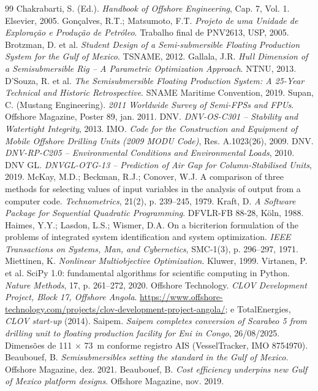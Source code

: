 \documentclass[11pt,a4paper]{article}
\begin{document}
\begin{thebibliography}{99}
 Chakrabarti, S. (Ed.). \emph{Handbook of Offshore Engineering}, Cap. 7,
Vol. 1. Elsevier, 2005.
 Gonçalves, R.T.; Matsumoto, F.T. \emph{Projeto de uma Unidade de Exploração
e Produção de Petróleo}. Trabalho final de PNV2613, USP, 2005.
 Brotzman, D. et al. \emph{Student Design of a Semi-submersible Floating
Production System for the Gulf of Mexico}. TSNAME, 2012.
 Gallala, J.R. \emph{Hull Dimension of a Semisubmersible Rig -- A Parametric
Optimization Approach}. NTNU, 2013.
 D'Souza, R. et al. \emph{The Semisubmersible Floating Production System: A
25-Year Technical and Historic Retrospective}. SNAME Maritime Convention, 2019.
 Supan, C. (Mustang Engineering). \emph{2011 Worldwide Survey of Semi-FPSs and
FPUs}. Offshore Magazine, Poster 89, jan. 2011.
 DNV. \emph{DNV-OS-C301 -- Stability and Watertight Integrity}, 2013.
 IMO. \emph{Code for the Construction and Equipment of Mobile Offshore Drilling
Units (2009 MODU Code)}, Res. A.1023(26), 2009.
 DNV. \emph{DNV-RP-C205 -- Environmental Conditions and Environmental Loads}, 2010.
 DNV GL. \emph{DNVGL-OTG-13 -- Prediction of Air Gap for Column-Stabilised
Units}, 2019.
 McKay, M.D.; Beckman, R.J.; Conover, W.J. A comparison of three methods for
selecting values of input variables in the analysis of output from a computer code.
\emph{Technometrics}, 21(2), p. 239--245, 1979.
 Kraft, D. \emph{A Software Package for Sequential Quadratic Programming}.
DFVLR-FB 88-28, Köln, 1988.
 Haimes, Y.Y.; Lasdon, L.S.; Wismer, D.A. On a bicriterion formulation of the
problems of integrated system identification and system optimization. \emph{IEEE Transactions on
Systems, Man, and Cybernetics}, SMC-1(3), p. 296--297, 1971.
 Miettinen, K. \emph{Nonlinear Multiobjective Optimization}. Kluwer, 1999.
 Virtanen, P. et al. SciPy 1.0: fundamental algorithms for scientific computing in
Python. \emph{Nature Methods}, 17, p. 261--272, 2020.
 Offshore Technology. \emph{CLOV Development Project, Block 17, Offshore Angola}.
\url{https://www.offshore-technology.com/projects/clov-development-project-angola/}; e TotalEnergies,
\emph{CLOV start-up} (2014).
 Saipem. \emph{Saipem completes conversion of Scarabeo 5 from drilling unit to
floating production facility for Eni in Congo}, 26/08/2025. Dimensões de 111 × 73~m conforme
registro AIS (VesselTracker, IMO 8754970).
 Beaubouef, B. \emph{Semisubmersibles setting the standard in the Gulf of
Mexico}. Offshore Magazine, dez. 2021.
 Beaubouef, B. \emph{Cost efficiency underpins new Gulf of Mexico platform
designs}. Offshore Magazine, nov. 2019.
\end{thebibliography}
\end{document}
